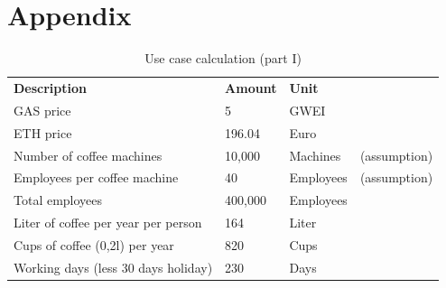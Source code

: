 \documentclass[conference]{IEEEtran}
\begin{document}
\newpage

\section*{Appendix}
\label{appendix}

\begin{table}[!htbp]
\centering
\caption{Use case calculation (part I)}
\begin{tabular}{llll}
\textbf{Description}                         & \textbf{Amount}     & \textbf{Unit}                                                 & \textbf{}                                                           \\
GAS price                                    & 5                   & GWEI                                                          &                                                                     \\
ETH price                                    & 196.04              & Euro                                                          &                                                                     \\
Number of coffee machines                    & 10,000              & Machines                                                      & (assumption)                                                        \\
Employees per coffee machine                 & 40                  & Employees                                                     & (assumption)                                                        \\
Total employees                              & 400,000             & Employees                                                     &                                                                     \\
Liter of coffee per year per person          & 164                 & Liter                                                         &                                                                     \\
Cups of coffee (0,2l) per year               & 820                 & Cups                                                          &                                                                     \\
Working days (less 30 days holiday)          & 230                 & Days                                                          &                                                                     \\

\end{tabular}
\end{table}
\end{document}
